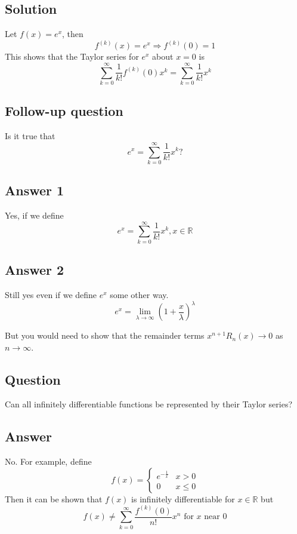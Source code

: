 \documentclass[11pt]{article}
\newcommand{\reals}{\mathbb{R}}
\begin{document}
\subsection{Solution}
Let $f(x) = e^x$, then 
\[ f^{(k)}(x) = e^x \Rightarrow f^{(k)}(0) = 1 \]
This shows that the Taylor series for $e^x$ about $x=0$ is
\[ \sum_{k=0}^\infty \frac{1}{k!}f^{(k)}(0) x^k = \sum_{k=0}^\infty \frac{1}{k!} x^k \]

\subsection{Follow-up question}
Is it true that
\[ e^x = \sum_{k=0}^\infty \frac{1}{k!} x^k \text{?} \]

\subsection{Answer 1}
Yes, if we define
\[ e^x = \sum_{k=0}^\infty \frac{1}{k!} x^k, x \in \reals \]

\subsection{Answer 2}
Still yes even if we define $e^x$ some other way.
\[ e^x = \lim_{\lambda\rightarrow\infty} \left( 1 +\frac{x}{\lambda} \right)^\lambda \]

But you would need to show that the remainder terms $x^{n+1} R_n(x) \rightarrow 0$ as $n \rightarrow \infty$.

\subsection{Question}
Can all infinitely differentiable functions be represented by their Taylor series?

\subsection{Answer}
No. For example, define
\[ 
f(x) = \begin{cases}
e^{- \frac{1}{x}} & x>0 \\
0 & x \leq 0
\end{cases}
\]
Then it can be shown that $f(x)$ is infinitely differentiable for $x \in \reals$ but
\[ f(x) \not= \sum_{k=0}^\infty \frac{f^{(k)}(0)}{n!} x^n \text{ for } x \text{ near 0} \]
\end{document}
